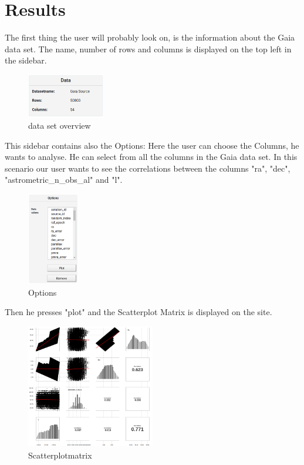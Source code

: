 \documentclass{vgtc}                          %
\begin{document}
\section{Results}
The first thing the user will probably look on, is the information about the Gaia data set. The name, number of rows and columns is displayed on the top left in the sidebar. \\

\begin{figure}[H]
\includegraphics[width=0.3\textwidth]{1d.png}
\centering
\caption{data set overview}
\end{figure}

 This sidebar contains also the Options: Here the user can choose the Columns, he wants to analyse. He can select from all the columns in the Gaia data set. In this scenario our user wants to see the correlations between the columns "ra", "dec", "astrometric\_n\_obs\_al" and "l".
 
\begin{figure}[H]
\includegraphics[width=0.2\textwidth]{options.png}
\centering
\caption{Options}
\end{figure} 
 
Then he presses "plot" and the Scatterplot Matrix is displayed on the site.

\begin{figure}[H]
\includegraphics[width=0.5\textwidth]{scattermatrix.png}
\centering
\caption{Scatterplotmatrix}
\end{figure}
\end{document}
